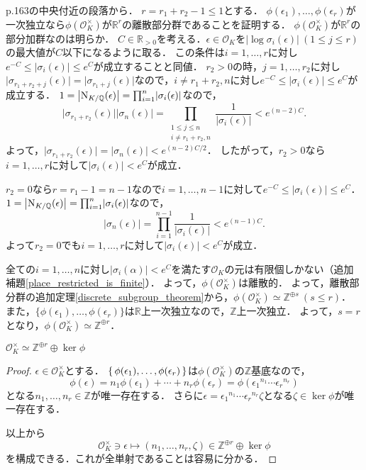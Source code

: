 p.163の中央付近の段落から．
$r=r_1+r_2-1\leq1$とする．
$\phi(\epsilon_1),\ldots,\phi(\epsilon_r)$が一次独立なら$\phi(\mathcal{O}_K^\times)$が$\mathbb{R}^r$の離散部分群であることを証明する．
$\phi(\mathcal{O}_K^\times)$が$\mathbb{R}^r$の部分加群なのは明らか．
$C\in\mathbb{R}_{>0}$を考える．$\epsilon\in\mathcal{O}_K$を$\lvert\log\sigma_i(\epsilon)\rvert\ (1\leq j\leq r)$の最大値が$C$以下になるように取る．
この条件は$i=1,\ldots,r$に対し$e^{-C}\leq\lvert\sigma_i(\epsilon)\rvert\leq e^C$が成立することと同値．
$r_2>0$の時，$j=1,\ldots,r_2$に対し$\lvert\sigma_{r_1+r_2+j}(\epsilon)\rvert=\lvert\sigma_{r_1+j}(\epsilon)\rvert$なので，$i\neq r_1+r_2,n$に対し$e^{-C}\leq\lvert\sigma_i(\epsilon)\rvert\leq e^C$が成立する．
$1=\left\lvert\operatorname{N}_{K/\mathbb{Q}}(\epsilon)\right\rvert=\prod_{i=1}^n\lvert\sigma_i(\epsilon)\rvert$なので，
\[\lvert\sigma_{r_1+r_2}(\epsilon)\rvert\lvert\sigma_n(\epsilon)\rvert=\prod_{\substack{1\leq j\leq n\\ i\neq r_1+r_2,n}}\frac{1}{\lvert\sigma_i(\epsilon)\rvert}< e^{(n-2)C}.\]
よって，$\lvert\sigma_{r_1+r_2}(\epsilon)\rvert=\lvert\sigma_n(\epsilon)\rvert< e^{(n-2)C/2}$．
したがって，$r_2>0$なら$i=1,\ldots,r$に対して$\lvert\sigma_i(\epsilon)\rvert< e^{C}$が成立．

$r_2=0$なら$r=r_1-1=n-1$なので$i=1,\ldots,n-1$に対して$e^{-C}\leq\lvert\sigma_i(\epsilon)\rvert\leq e^C$．
$1=\left\lvert\operatorname{N}_{K/\mathbb{Q}}(\epsilon)\right\rvert=\prod_{i=1}^n\lvert\sigma_i(\epsilon)\rvert$なので，
\[\lvert\sigma_n(\epsilon)\rvert=\prod_{i=1}^{n-1}\frac{1}{\lvert\sigma_i(\epsilon)\rvert}< e^{(n-1)C}.\]
よって$r_2=0$でも$i=1,\ldots,r$に対して$\lvert\sigma_i(\epsilon)\rvert< e^{C}$が成立．

全ての$i=1,\ldots,n$に対し$\lvert\sigma_i(\alpha)\rvert< e^C$を満たす$\mathcal{O}_K$の元は有限個しかない（追加補題\ref{place_restricted_is_finite}）．
よって，$\phi(\mathcal{O}_K^\times)$は離散的．
よって，離散部分群の追加定理\ref{discrete_subgroup_theorem}から，$\phi(\mathcal{O}_K^\times)\simeq\mathbb{Z}^{\oplus s}\ (s\leq r)$．
また，$\{\phi(\epsilon_1),\ldots,\phi(\epsilon_r)\}$は$\mathbb{R}$上一次独立なので，$\mathbb{Z}$上一次独立．
よって，$s=r$となり，$\phi(\mathcal{O}_K^\times)\simeq\mathbb{Z}^{\oplus r}$．

\begin{screen}
  \(\mathcal{O}_K^\times \simeq \mathbb{Z}^{\oplus r}\oplus \ker\phi\)
\end{screen}
\begin{proof}
  \(\epsilon\in\mathcal{O}_K^\times\)とする．
  \(\set{\phi(\epsilon_1), \ldots, \phi(\epsilon_r)}\)は\(\phi(\mathcal{O}_K^\times)\)の\(\mathbb{Z}\)基底なので，
  \[ \phi(\epsilon) = n_1 \phi(\epsilon_1) + \cdots + n_r \phi(\epsilon_r) = \phi(\epsilon_1{}^{n_1} \cdots \epsilon_r{}^{n_r}) \]
  となる\(n_1, \ldots, n_r \in \mathbb{Z}\)が唯一存在する．
  さらに\(\epsilon = \epsilon_1{}^{n_1} \cdots \epsilon_r{}^{n_r} \zeta\)となる\(\zeta\in\ker\phi\)が唯一存在する．

  以上から
  \[ \mathcal{O}_K^\times \ni \epsilon \mapsto (n_1, \ldots, n_r, \zeta) \in \mathbb{Z}^{\oplus r}\oplus \ker\phi \]
  を構成できる．これが全単射であることは容易に分かる．
\end{proof}

